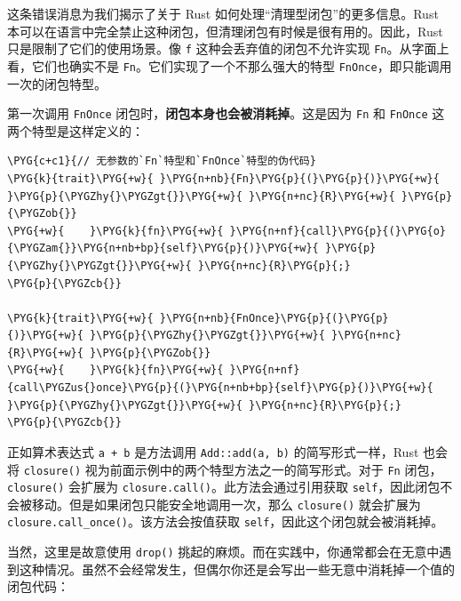 这条错误消息为我们揭示了关于 Rust 如何处理“清理型闭包”的更多信息。Rust 本可以在语言中完全禁止这种闭包，但清理闭包有时候是很有用的。因此，Rust 只是限制了它们的使用场景。像 \texttt{f} 这种会丢弃值的闭包不允许实现 \texttt{Fn}。从字面上看，它们也确实不是 \texttt{Fn}。它们实现了一个不那么强大的特型 \texttt{FnOnce}，即只能调用一次的闭包特型。

第一次调用 \texttt{FnOnce} 闭包时，\textbf{闭包本身也会被消耗掉}。这是因为 \texttt{Fn} 和 \texttt{FnOnce} 这两个特型是这样定义的：

\begin{Verbatim}[commandchars=\\\{\},breaklines=true,breakanywhere=true,fontsize=\codefont,xleftmargin=17bp]
\PYG{c+c1}{// 无参数的`Fn`特型和`FnOnce`特型的伪代码}
\PYG{k}{trait}\PYG{+w}{ }\PYG{n+nb}{Fn}\PYG{p}{(}\PYG{p}{)}\PYG{+w}{ }\PYG{p}{\PYGZhy{}\PYGZgt{}}\PYG{+w}{ }\PYG{n+nc}{R}\PYG{+w}{ }\PYG{p}{\PYGZob{}}
\PYG{+w}{    }\PYG{k}{fn}\PYG{+w}{ }\PYG{n+nf}{call}\PYG{p}{(}\PYG{o}{\PYGZam{}}\PYG{n+nb+bp}{self}\PYG{p}{)}\PYG{+w}{ }\PYG{p}{\PYGZhy{}\PYGZgt{}}\PYG{+w}{ }\PYG{n+nc}{R}\PYG{p}{;}
\PYG{p}{\PYGZcb{}}

\PYG{k}{trait}\PYG{+w}{ }\PYG{n+nb}{FnOnce}\PYG{p}{(}\PYG{p}{)}\PYG{+w}{ }\PYG{p}{\PYGZhy{}\PYGZgt{}}\PYG{+w}{ }\PYG{n+nc}{R}\PYG{+w}{ }\PYG{p}{\PYGZob{}}
\PYG{+w}{    }\PYG{k}{fn}\PYG{+w}{ }\PYG{n+nf}{call\PYGZus{}once}\PYG{p}{(}\PYG{n+nb+bp}{self}\PYG{p}{)}\PYG{+w}{ }\PYG{p}{\PYGZhy{}\PYGZgt{}}\PYG{+w}{ }\PYG{n+nc}{R}\PYG{p}{;}
\PYG{p}{\PYGZcb{}}
\end{Verbatim}

正如算术表达式 \texttt{a + b} 是方法调用 \texttt{Add::add(a, b)} 的简写形式一样，Rust 也会将 \texttt{closure()} 视为前面示例中的两个特型方法之一的简写形式。对于 \texttt{Fn} 闭包，\texttt{closure()} 会扩展为 \texttt{closure.call()}。此方法会通过引用获取 \texttt{self}，因此闭包不会被移动。但是如果闭包只能安全地调用一次，那么 \texttt{closure()} 就会扩展为 \texttt{closure.call\_once()}。该方法会按值获取 \texttt{self}，因此这个闭包就会被消耗掉。

当然，这里是故意使用 \texttt{drop()} 挑起的麻烦。而在实践中，你通常都会在无意中遇到这种情况。虽然不会经常发生，但偶尔你还是会写出一些无意中消耗掉一个值的闭包代码：

